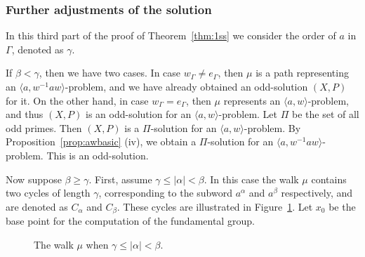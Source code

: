 \documentclass[11pt]{amsart}
\theoremstyle{definition}
\theoremstyle{definition}
\numberwithin{equation}{section}
\begin{document}
\subsubsection{Further adjustments of the solution}

In this third part of the proof of Theorem~\ref{thm:1ss} we consider the order of $a$ in $\Gamma$, denoted as $\gamma$. 

If $\beta<\gamma$, then we have two cases. In case $w_\Gamma\neq e_\Gamma$, then $\mu$ is a path representing an $\langle a, w^{-1}aw\rangle$-problem, and we have already obtained an odd-solution $(X, P)$ for it. On the other hand, in case $w_\Gamma=e_\Gamma$, then $\mu$ represents an $\langle a, w\rangle$-problem, and thus $(X, P)$ is an odd-solution for an $\langle a, w\rangle$-problem. Let $\Pi$ be the set of all odd primes. Then $(X, P)$ is a $\Pi$-solution for an $\langle a, w\rangle$-problem. By Proposition~\ref{prop:awbasic} (iv), we obtain a $\Pi$-solution for an $\langle a, w^{-1}aw\rangle$-problem. This is an odd-solution. 

Now suppose $\beta\geq\gamma$. First, assume $\gamma\leq |\alpha|<\beta$. In this case the walk $\mu$ contains two cycles of length $\gamma$, corresponding to the subword $a^\alpha$ and $a^\beta$ respectively, and are denoted as $C_\alpha$ and $C_\beta$. These cycles are illustrated in Figure~\ref{fig:1ss1}. Let $x_0$ be the base point for the computation of the fundamental group. 

\begin{figure}[htbp]
\centering
\caption{\label{fig:1ss1} The walk $\mu$ when $\gamma\leq |\alpha|<\beta$.}
\end{figure}
\end{document}
